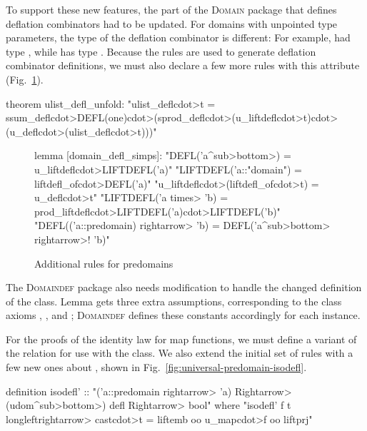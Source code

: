 To support these new features, the part of the \textsc{Domain} package that defines deflation combinators had to be updated. For domains with unpointed type parameters, the type of the deflation combinator is different: For example,  had type , while  has type . Because the  rules are used to generate deflation combinator definitions, we must also declare a few more rules with this attribute (Fig.~\ref{fig:universal-predomain-defl-simps}).

\begin{isacode}
theorem ulist_defl_unfold: "ulist_defl\<cdot>t =
  ssum_defl\<cdot>DEFL(one)\<cdot>(sprod_defl\<cdot>(u_liftdefl\<cdot>t)\<cdot>(u_defl\<cdot>(ulist_defl\<cdot>t)))"
\end{isacode}

\begin{figure}
\begin{isacode}
lemma [domain_defl_simps]:
  "DEFL('a\<^sub>\<bottom>) = u_liftdefl\<cdot>LIFTDEFL('a)"
  "LIFTDEFL('a::"domain") = liftdefl_of\<cdot>DEFL('a)"
  "u_liftdefl\<cdot>(liftdefl_of\<cdot>t) = u_defl\<cdot>t"
  "LIFTDEFL('a \<times> 'b) = prod_liftdefl\<cdot>LIFTDEFL('a)\<cdot>LIFTDEFL('b)"
  "DEFL(('a::predomain) \<rightarrow> 'b) = DEFL('a\<^sub>\<bottom> \<rightarrow>! 'b)"
\end{isacode}
\caption{Additional  rules for predomains}
\label{fig:universal-predomain-defl-simps}
\end{figure}

The \textsc{Domaindef} package also needs modification to handle the changed definition of the  class. Lemma  gets three extra assumptions, corresponding to the class axioms , , and ; \textsc{Domaindef} defines these constants accordingly for each instance.

For the proofs of the identity law for map functions, we must define a variant of the  relation for use with the  class. We also extend the initial set of  rules with a few new ones about , shown in Fig.~\ref{fig:universal-predomain-isodefl}.
%
\begin{isacode}
definition isodefl' :: "('a::predomain \<rightarrow> 'a) \<Rightarrow> (udom\<^sub>\<bottom>) defl \<Rightarrow> bool"
  where "isodefl' f t \<longleftrightarrow> cast\<cdot>t = liftemb oo u_map\<cdot>f oo liftprj"
\end{isacode}

